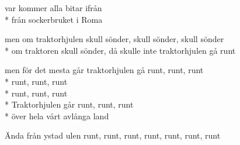 \begin{SongText}[Traktorhjulen]
\begin{SongVerse}
        var kommer alla bitar ifrån\\*%
        från sockerbruket i Roma
    \end{SongVerse}
    \begin{SongVerse}
        men om traktorhjulen skull sönder, skull sönder, skull sönder\\*%
        om traktoren skull sönder, då skulle inte traktorhjulen gå runt
    \end{SongVerse}
    \begin{SongVerse}
        men för det mesta går traktorhjulen gå runt, runt, runt\\*%
        runt, runt, runt\\*%
        runt, runt, runt\\*%
        Traktorhjulen går runt, runt, runt\\*%
        över hela vårt avlånga land
    \end{SongVerse}
    \begin{SongVerse}
        Ända från ystad 
        ulen runt, runt, runt, runt, runt, runt, runt
    \end{SongVerse}
\end{SongText}